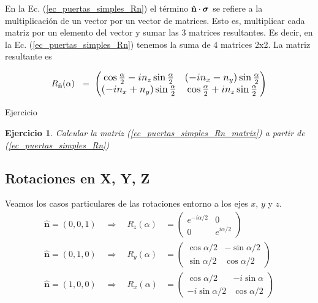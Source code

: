 \documentclass[a4paper,11pt]{book} %
\newtheorem{ejercicio_contador}{Ejercicio}
\newcommand{\Ejercicio}[1]{
		\begin{mybox_gray}{Ejercicio} 
			\begin{ejercicio_contador}
				 #1 
			\end{ejercicio_contador} 
		\end{mybox_gray}
	}
\numberwithin{equation}{chapter}
\def\lp{\left(}
\def\rp{\right)}
\def\rqa{\quad \Rightarrow \quad}
\begin{document}
En la Ec. (\ref{ec_puertas_simples_Rn}) el término $\hat{\bf n}\cdot \boldsymbol{\sigma}$ se refiere a la multiplicación de un vector por un vector de matrices. Esto es, multiplicar cada matriz por un elemento del vector y sumar las 3 matrices resultantes. Es decir, en la Ec. (\ref{ec_puertas_simples_Rn}) tenemos la suma de 4 matrices 2x2. La matriz resultante es
	
	\begin{equation} \label{ec_puertas_simples_Rn_matrix}
	R_{\hat{\bf n}}(\alpha)~  ~=~ \large{\lp \begin{matrix} 
	\cos \frac{\alpha}{2} - i n_z\sin\frac{\alpha}{2} 
	& (-in_x- n_y)\sin\frac{\alpha}{2} \\ 
	(-in_x + n_y) \sin\frac{\alpha}{2} 
	&  \cos \frac{\alpha}{2} + i n_z\sin\frac{\alpha}{2} 
	\end{matrix} \rp}
	\end{equation}
			

\Ejercicio{Calcular la matriz (\ref{ec_puertas_simples_Rn_matrix}) a partir de (\ref{ec_puertas_simples_Rn})}

        \subsection{Rotaciones en X, Y, Z}

Veamos los casos particulares de las rotaciones entorno a los ejes $x$, $y$ y $z$.        
\begin{align}
\bm \hat{n} = (0,0,1) \rqa R_z(\alpha) & = 
	 \lp \begin{matrix}
	 e^{-i \alpha/2} & 0                       \\
	 0               & e^{i \alpha/2} 
	 \end{matrix} \rp   \label{ec_puertas_simples_Rz} \\
\bm \hat{n} = (0,1,0) \rqa R_y(\alpha) & =
	 \lp \begin{matrix}
	 \cos \alpha/2     &  -\sin \alpha/2       \\
	 \sin \alpha/2     &  \cos \alpha/2 
	 \end{matrix} \rp  \label{ec_puertas_simples_Ry} \\
\bm \hat{n} = (1,0,0) \rqa R_x(\alpha) & = 
	 \lp \begin{matrix}
	 \cos \alpha/2       &   -i \sin \alpha     \\
	 -i \sin \alpha/2    &   \cos \alpha/2 
	 \end{matrix} \rp \label{ec_puertas_simples_Rx}
\end{align} 
        
\end{document}
